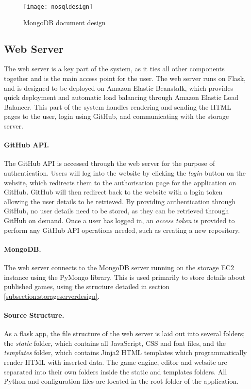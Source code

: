 
	\begin{figure}[h]
		\centering
		\texttt{[image: nosqldesign]}
		\caption{MongoDB document design}
		\label{fig:nosqldesign}
	\end{figure}

	\subsection{Web Server}
	The web server is a key part of the system, as it ties all other components together and is the main access point for the user. The web server runs on Flask, and is designed to be deployed on Amazon Elastic Beanstalk, which provides quick deployment and automatic load balancing through Amazon Elastic Load Balancer. This part of the system handles rendering and sending the HTML pages to the user, login using GitHub, and communicating with the storage server.

	\paragraph{GitHub API.}
	The GitHub API is accessed through the web server for the purpose of authentication. Users will log into the website by clicking the \emph{login} button on the website, which redirects them to the authorisation page for the application on GitHub. GitHub will then redirect back to the website with a login token allowing the user details to be retrieved. By providing authentication through GitHub, no user details need to be stored, as they can be retrieved through GitHub on demand. Once a user has logged in, an \emph{access token} is provided to perform any GitHub API operations needed, such as creating a new repository.

	\paragraph{MongoDB.}
	The web server connects to the MongoDB server running on the storage EC2 instance using the PyMongo library. This is used primarily to store details about published games, using the structure detailed in section \ref{subsection:storageserverdesign}.

	\paragraph{Source Structure.}
	As a flask app, the file structure of the web server is laid out into several folders; the \emph{static} folder, which contains all JavaScript, CSS and font files, and the \emph{templates} folder, which contains Jinja2 HTML templates which programmatically render HTML with inserted data. The game engine, editor and website are separated into their own folders inside the static and templates folders. All Python and configuration files are located in the root folder of the application.


